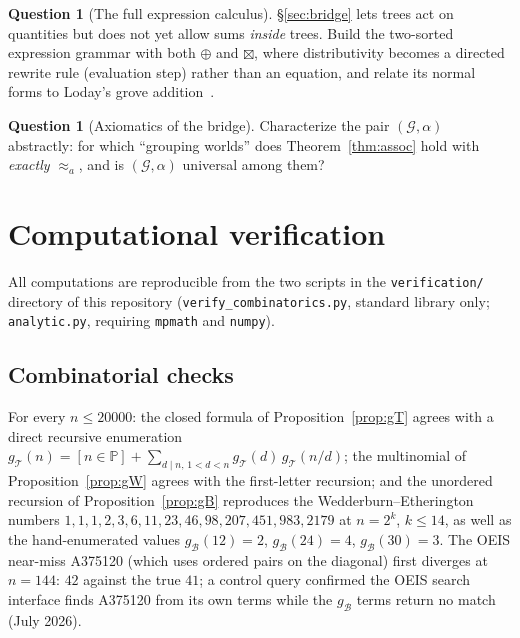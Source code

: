 \documentclass[11pt]{article}
\newcommand{\cT}{\mathcal{T}}   %
\newcommand{\cB}{\mathcal{B}}   %
\newcommand{\cG}{\mathcal{G}}   %
\numberwithin{equation}{section}
\theoremstyle{plain}
\theoremstyle{definition}
\newtheorem{question}[theorem]{Question}
\theoremstyle{remark}
\begin{document}
\begin{question}[The full expression calculus]\label{prob:calculus}
\S\ref{sec:bridge} lets trees act on quantities but does not yet allow sums \emph{inside}
trees. Build the two-sorted expression grammar with both $\oplus$ and $\boxtimes$,
where distributivity becomes a directed rewrite rule (evaluation step) rather than an
equation, and relate its normal forms to Loday's grove addition~\cite{loday,brunoyasaki}.
\end{question}

\begin{question}[Axiomatics of the bridge]\label{prob:axioms}
Characterize the pair $(\cG, \alpha)$ abstractly: for which ``grouping worlds'' does
Theorem~\ref{thm:assoc} hold with \emph{exactly} $\approx_a$, and is $(\cG,\alpha)$
universal among them?
\end{question}

\appendix
\section{Computational verification}\label{app:verification}

All computations are reproducible from the two scripts in the \texttt{verification/}
directory of this repository (\texttt{verify\_combinatorics.py}, standard library only;
\texttt{analytic.py}, requiring \texttt{mpmath} and \texttt{numpy}).

\subsection{Combinatorial checks}

For every $n \le 20000$: the closed formula of Proposition~\ref{prop:gT} agrees with a
direct recursive enumeration $g_\cT(n) = [n \in \mathbb{P}] + \sum_{d \mid n,\, 1<d<n}
g_\cT(d)\, g_\cT(n/d)$; the multinomial of Proposition~\ref{prop:gW} agrees with the
first-letter recursion; and the unordered recursion of Proposition~\ref{prop:gB}
reproduces the Wedderburn--Etherington numbers $1,1,1,2,3,6,11,23,46,98,207,451,983,2179$
at $n = 2^k$, $k \le 14$, as well as the hand-enumerated values $g_\cB(12)=2$,
$g_\cB(24)=4$, $g_\cB(30)=3$. The OEIS near-miss A375120 (which uses ordered pairs on
the diagonal) first diverges at $n = 144$: $42$ against the true $41$; a control query
confirmed the OEIS search interface finds A375120 from its own terms while the
$g_\cB$ terms return no match (July 2026).
\end{document}
